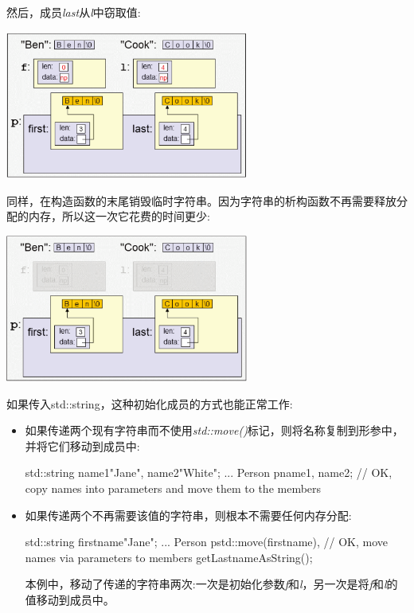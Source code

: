 然后，成员\textit{last}从\textit{l}中窃取值:

\begin{center}
	\includegraphics[width=0.6\textwidth]{part1/ch4/images/6}
\end{center}

同样，在构造函数的末尾销毁临时字符串。因为字符串的析构函数不再需要释放分配的内存，所以这一次它花费的时间更少:

\begin{center}
	\includegraphics[width=0.6\textwidth]{part1/ch4/images/7}
\end{center}

如果传入std::string，这种初始化成员的方式也能正常工作:

\begin{itemize}
	\item 如果传递两个现有字符串而不使用\textit{std::move()}标记，则将名称复制到形参中，并将它们移动到成员中:

	\begin{cppcode}
std::string name1{"Jane"}, name2{"White"};
...
Person p{name1, name2}; // OK, copy names into parameters and move them to the members
	\end{cppcode}
	\item 如果传递两个不再需要该值的字符串，则根本不需要任何内存分配:
	\begin{cppcode}
std::string firstname{"Jane"};
...
Person p{std::move(firstname), // OK, move names via parameters to members
	getLastnameAsString()};
	\end{cppcode}
	本例中，移动了传递的字符串两次:一次是初始化参数\textit{f}和\textit{l}，另一次是将\textit{f}和\textit{l}的值移动到成员中。
\end{itemize}

